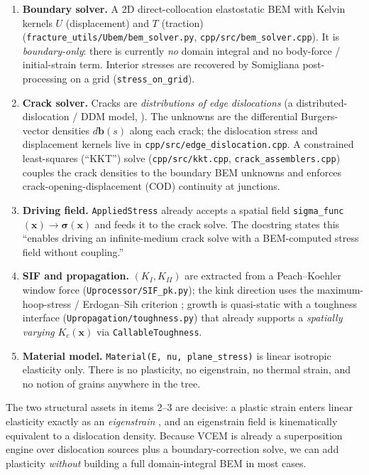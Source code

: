 \documentclass[11pt]{article}
\newcommand{\Bvec}{\mathbf{b}}
\newcommand{\xvec}{\mathbf{x}}
\newcommand{\sig}{\bm{\sigma}}
\begin{document}
\begin{enumerate}[leftmargin=1.4em]
\item \textbf{Boundary solver.} A 2D direct-collocation elastostatic BEM with
Kelvin kernels $U$ (displacement) and $T$ (traction)
(\texttt{fracture\_utils/Ubem/bem\_solver.py}, \texttt{cpp/src/bem\_solver.cpp}).
It is \emph{boundary-only}: there is currently \emph{no} domain integral and no
body-force / initial-strain term. Interior stresses are recovered by
Somigliana post-processing on a grid (\texttt{stress\_on\_grid}).

\item \textbf{Crack solver.} Cracks are \emph{distributions of edge
dislocations} (a distributed-dislocation / DDM model,
\citealp{hills1996ddt,bilby1968}). The unknowns are the differential
Burgers-vector densities $d\Bvec(s)$ along each crack; the dislocation stress
and displacement kernels live in \texttt{cpp/src/edge\_dislocation.cpp}. A
constrained least-squares (``KKT'') solve
(\texttt{cpp/src/kkt.cpp}, \texttt{crack\_assemblers.cpp}) couples the crack
densities to the boundary BEM unknowns and enforces crack-opening-displacement
(COD) continuity at junctions.

\item \textbf{Driving field.} \texttt{AppliedStress} already accepts a spatial
field \texttt{sigma\_func}$(\xvec)\!\to\!\sig(\xvec)$ and feeds it to the crack
solve. The docstring states this ``enables driving an infinite-medium crack
solve with a BEM-computed stress field without coupling.''

\item \textbf{SIF and propagation.} $(K_I,K_{II})$ are extracted from a
Peach--Koehler window force (\texttt{Uprocessor/SIF\_pk.py}); the kink direction
uses the maximum-hoop-stress / Erdogan--Sih criterion
\citep{erdogan_sih1963}; growth is quasi-static with a toughness interface
(\texttt{Upropagation/toughness.py}) that already supports a \emph{spatially
varying} $K_c(\xvec)$ via \texttt{CallableToughness}.

\item \textbf{Material model.} \texttt{Material(E, nu, plane\_stress)} is linear
isotropic elasticity only. There is no plasticity, no eigenstrain, no thermal
strain, and no notion of grains anywhere in the tree.
\end{enumerate}

\noindent
The two structural assets in items 2--3 are decisive: a plastic strain enters
linear elasticity exactly as an \emph{eigenstrain} \citep{mura1987,eshelby1957},
and an eigenstrain field is kinematically equivalent to a dislocation density.
Because VCEM is already a superposition engine over dislocation sources plus a
boundary-correction solve, we can add plasticity \emph{without} building a full
domain-integral BEM in most cases.
\end{document}
